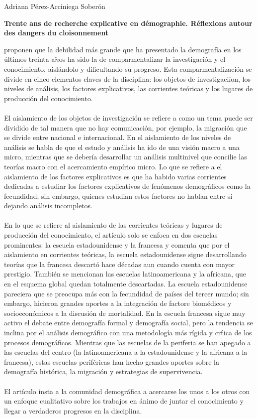 \documentclass[11pt,spanish,letterpaper]{article}
\theoremstyle{plain}
\begin{document}
\begin{flushleft}
Adriana P\'erez-Arciniega Sober\'on
\end{flushleft}
\begin{center}
\textbf{Trente ans de recherche explicative en d\'emographie. R\'eflexions autour des dangers du cloisonnement}
\end{center} 
\cite{poirier1999trente} proponen que la debilidad m\'as grande que ha presentado la demograf\'ia en los \'ultimos treinta a$\tilde{n}$os ha sido la de comparmentalizar la investigaci\'on y el conocimiento, aisl\'andolo y dificultando su progreso. Esta comparmentalizaci\'on se divide en cinco elementos claves de la disciplina: los objetos de investigaci\'ion, los niveles de an\'alisis, los factores explicativos, las corrientes te\'oricas y los lugares de producci\'on del conocimiento.\\
\\ 
El aislamiento de los objetos de investigaci\'on se refiere a como un tema puede ser dividido de tal manera que no hay comunicaci\'on, por ejemplo, la migraci\'on que se divide entre nacional e internacional. En el aislamiento de los niveles de an\'alisis se habla de que el estudo y an\'alisis ha ido de una visi\'on macro a una micro, mientras que se deber\'ia desarrollar un an\'alisis multinivel que concilie las teor\'ias macro con el acercamiento emp\'irico micro. Lo que se refiere a el aislamiento de los factores explicativos es que ha habido varias corrientes dedicadas a estudiar los factores explicativos de fen\'omenos demogr\'aficos como la fecundidad; sin embargo, quienes estudian estos factores no hablan entre s\'i dejando an\'alisis incompletos.\\
\\
En lo que se refiere al aislamiento de las corrientes te\'oricas y lugares de producci\'on del conocimiento, el art\'iculo solo se enfoca en dos escuelas prominentes: la escuela estadounidense y la francesa y comenta que por el aislamiento en corrientes te\'oricas, la escuela estadounidense sigue desarrollando teor\'ias que la francesa descart\'o hace d\'ecadas aun cuando cuenta con mayor prestigio. Tambi\'en se mencionan las escuelas latinoamericana y la africana, que en el esquema global quedan totalmente descartadas. La escuela estadounidense pareciera que se preocupa m\'as con la fecundidad de pa\'ises del tercer mundo; sin embargo, hicieron grandes aportes a la integraci\'on de factore biom\'edicos y socioecon\'omicos a la discusi\'on de mortalidad. En la escuela francesa sigue muy activo el debate entre demograf\'ia formal y demograf\'ia social, pero la tendencia se inclina por el an\'alisis demogr\'afico con una metodolog\'ia m\'as r\'igida y cr\'tica de los procesos demogr\'aficos. Mientras que las escuelas de la periferia se han apegado a las escuelas del centro (la latinoamericana a la estadounidense y la africana a la francesa), estas escuelas perif\'ericas han hecho grandes aportes sobre la demograf\'ia hist\'orica, la migraci\'on y estrategias de supervivencia.\\
\\
El art\'iculo insta a la comunidad demogr\'afica a acercarse los unos a los otros con un enfoque cualitativo sobre los trabajos en \'animo de juntar el conocimiento y llegar a verdaderos progresos en la disciplina. 


\end{document}
